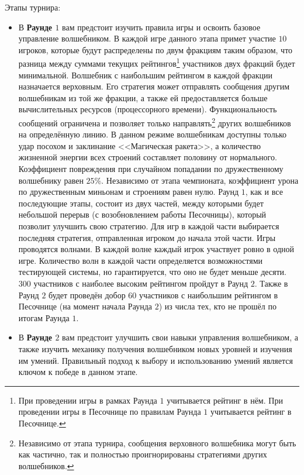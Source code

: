 Этапы турнира:
\begin{itemize}
  \item В \textbf{Раунде $1$} вам предстоит изучить правила игры и освоить базовое управление волшебником. В каждой игре данного этапа
        примет участие $10$ игроков, которые будут распределены по двум фракциям таким образом, что разница между суммами текущих
        рейтингов\footnote[1]{При проведении игры в рамках Раунда $1$ учитывается рейтинг в нём. При проведении игры в Песочнице по правилам
        Раунда $1$ учитывается рейтинг в Песочнице.} участников двух фракций будет минимальной. Волшебник с наибольшим рейтингом в каждой
        фракции назначается верховным. Его стратегия может отправлять сообщения другим волшебникам из той же фракции, а также ей
        предоставляется больше вычислительных ресурсов (процессорного времени). Функциональность сообщений ограничена и позволяет только
        направлять\footnote[2]{Независимо от этапа турнира, сообщения верховного волшебника могут быть как частично, так и полностью
        проигнорированы стратегиями других волшебников.} других волшебников на определённую линию. В данном режиме волшебникам доступны
        только удар посохом и заклинание <<Магическая ракета>>, а количество жизненной энергии всех строений составляет половину от
        нормального. Коэффициент повреждения при случайном попадании по дружественному волшебнику равен $25\%$. Независимо от этапа
        чемпионата, коэффициент урона по дружественным миньонам и строениям равен нулю. Раунд $1$, как и все последующие этапы, состоит из
        двух частей, между которыми будет небольшой перерыв (с возобновлением работы Песочницы), который позволит улучшить свою стратегию.
        Для игр в каждой части выбирается последняя стратегия, отправленная игроком до начала этой части. Игры проводятся волнами. В каждой
        волне каждый игрок участвует ровно в одной игре. Количество волн в каждой части определяется возможностями тестирующей системы, но
        гарантируется, что оно не будет меньше десяти. $300$ участников с наиболее высоким рейтингом пройдут в Раунд $2$. Также в Раунд $2$
        будет проведён добор $60$ участников с наибольшим рейтингом в Песочнице (на момент начала Раунда $2$) из числа тех, кто не прошёл по
        итогам Раунда $1$.
  \item В \textbf{Раунде $2$} вам предстоит улучшить свои навыки управления волшебником, а также изучить механику получения волшебником
        новых уровней и изучения им умений. Правильный подход к выбору и использованию умений является ключом к победе в данном этапе.

\end{itemize}
